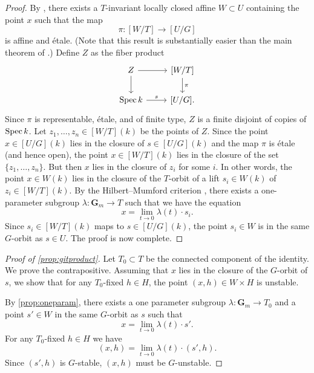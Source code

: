 \documentclass[12pt,reqno]{amsart}
\renewcommand{\k}{k}
\renewcommand{\to}{{\longrightarrow}}
\numberwithin{equation}{section}
\newcommand{\G}{\mathbf G}
\begin{document}
\begin{proof}
  By \cite[Theorem~3]{alp:10}, there exists a $T$-invariant locally closed affine $W \subset U$ containing the point $x$ such that the map
  \[ \pi \colon [W/T] \to [U / G]\]
  is affine and \'etale.
  (Note that this result is substantially easier than the main theorem of \cite{alp.hal.ryd:20}.)
  Define $Z$ as the fiber product
  \[
    \begin{tikzcd}
      Z \ar{r}\ar{d}& {[W/T]}\ar{d}{\pi}\\
      \spec \k \ar{r}{s}& {[U/G]}.
    \end{tikzcd}
  \]
  Since $\pi$ is representable, \'etale, and of finite type, $Z$ is a finite disjoint of copies of $\spec \k$.
  Let $z_1, \dots, z_n \in [W/T](\k)$ be the points of $Z$.
  Since the point $x \in [U/G](\k)$ lies in the closure of $s \in [U/G](\k)$ and the map $\pi$ is \'etale (and hence open), the point $x \in [W/T](\k)$ lies in the closure of the set $\{z_1,\dots, z_n\}$.
  But then $x$ lies in the closure of $z_i$ for some $i$.
  In other words, the point $x \in W(\k)$ lies in the closure of the $T$-orbit of a lift $s_i \in W(\k)$ of $z_i \in [W/T](\k)$.
  By the Hilbert--Mumford criterion \cite[Theorem~1.4]{kem:78}, there exists a one-parameter subgroup $\lambda \colon \G_m \to T$ such that we have the equation
  \begin{equation}\label{eqn:specialization}
    x = \lim_{t \to 0} \lambda (t) \cdot s_i.
  \end{equation}
  Since $s_i \in [W/T](\k)$ maps to $s \in [U/G](\k)$, the point $s_i \in W$ is in the same $G$-orbit as $s \in U$.
  The proof is now complete.
\end{proof}

\begin{proof}[Proof of \autoref{prop:gitproduct}]
  Let $T_0 \subset T$ be the connected  component of the identity.
  We prove the contrapositive.
  Assuming that $x$ lies in the closure of the $G$-orbit of $s$, we show that for any $T_0$-fixed $h \in H$, the point $(x, h) \in W \times H$ is unstable.

  By \autoref{prop:oneparam}, there exists a one parameter subgroup $\lambda \colon \G_m \to T_0$ and a point $s' \in W$ in the same $G$-orbit as $s$ such that
  \[ x = \lim_{t \to 0} \lambda(t) \cdot s'.\]
  For any $T_0$-fixed $h \in H$ we have
  \[
    (x, h) = \lim_{t \to 0} \lambda(t) \cdot (s', h).
  \]
  Since $(s',h)$ is $G$-stable, $(x,h)$ must be $G$-unstable.
\end{proof}
\end{document}
